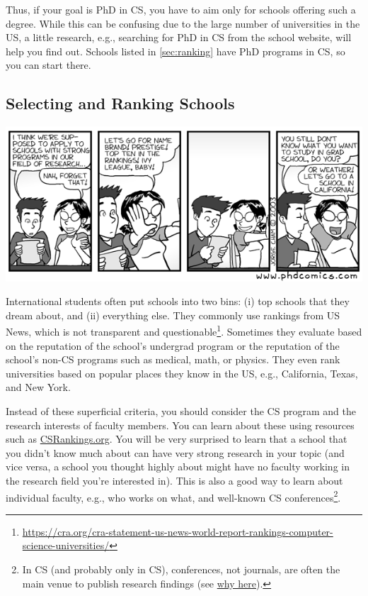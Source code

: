 \documentclass[oneside,11pt,dvipsnames]{book}
\begin{document}
Thus, if your goal is PhD in CS, you have to aim only for schools offering such a degree.  %
While this can be confusing due to the large number of universities in the US, a little research, e.g., searching for PhD in CS from the school website, will help you find out. Schools listed in \autoref{sec:ranking} have PhD programs in CS, so you can start there.


\subsection{Selecting and Ranking Schools}\label{sec:selecting-ranking-schools}
\begin{center}
  \includegraphics[scale=0.6]{files/c1.png}
\end{center}

International students often put schools into two bins: (i) top schools that they dream about, and (ii) everything else.  They commonly use rankings from US News, which is not transparent and questionable\footnote{\url{https://cra.org/cra-statement-us-news-world-report-rankings-computer-science-universities/}}.  Sometimes they evaluate based on the reputation of the school's undergrad program or the reputation of the school's non-CS programs such as medical, math, or physics.
They even rank universities based on popular places they know in the US, e.g., California, Texas, and New York.

Instead of these superficial criteria, you should consider the CS program and the research interests of faculty members.
You can learn about these using resources such as \href{https://csrankings.org}{CSRankings.org}. You will be very surprised to learn that a school that you didn't know much about can have very strong research in your topic (and vice versa, a school you thought highly about might have no faculty working in the research field you're interested in). This is also a good way to learn about individual faculty, e.g., who works on what, and well-known CS conferences\footnote{In CS (and probably only in CS), conferences, not journals, are often the main venue to publish research findings (see \href{https://homes.cs.washington.edu/~mernst/advice/conferences-vs-journals.html}{why here}).}. %
\end{document}
